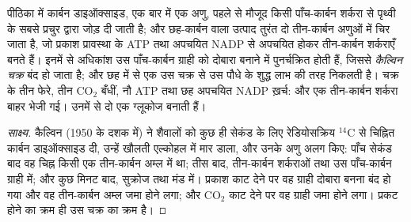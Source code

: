 \begin{proposition}[कैल्विन चक्र]\label{prop:g12:photosynthesis:calvin}
पीठिका में कार्बन डाइऑक्साइड, एक बार में एक अणु, पहले से मौजूद किसी
पाँच-कार्बन शर्करा से पृथ्वी के सबसे प्रचुर  द्वारा जोड़ दी जाती है;
और छह-कार्बन वाला उत्पाद तुरंत दो तीन-कार्बन अणुओं में चिर जाता है, जो
प्रकाश प्रावस्था के ATP तथा अपचयित NADP से अपचयित होकर तीन-कार्बन शर्कराएँ
बनते हैं। इनमें से अधिकांश उस पाँच-कार्बन ग्राही को दोबारा बनाने में
पुनर्चक्रित होती हैं, जिससे \emph{कैल्विन चक्र} बंद हो
जाता है; और छह में से एक उस चक्र से उस पौधे के शुद्ध लाभ की तरह निकलती है।
चक्र के तीन फेरे, तीन $\mathrm{CO_2}$ बँधीं, नौ ATP तथा छह अपचयित NADP
ख़र्च: और एक तीन-कार्बन शर्करा बाहर भेजी गई। उनमें से दो एक ग्लूकोज बनाती
हैं।
\end{proposition}
\begin{proof}[साक्ष्य]
कैल्विन (1950 के दशक में) ने शैवालों को कुछ ही सेकंड के लिए रेडियोसक्रिय
$^{14}$C से चिह्नित कार्बन डाइऑक्साइड दी, उन्हें खौलती एल्कोहल में मार
डाला, और उनके अणु अलग किए: पाँच सेकंड बाद वह चिह्न किसी एक तीन-कार्बन अम्ल
में था; तीस बाद, तीन-कार्बन शर्कराओं तथा उस पाँच-कार्बन ग्राही में; और कुछ
मिनट बाद, सुक्रोज तथा मंड में। प्रकाश काट देने पर वह ग्राही दोबारा बनना बंद
हो गया और वह तीन-कार्बन अम्ल जमा होने लगा; और $\mathrm{CO_2}$ काट देने पर
वह ग्राही जमा होने लगा। प्रकट होने का क्रम ही उस चक्र का क्रम है।
\end{proof}


